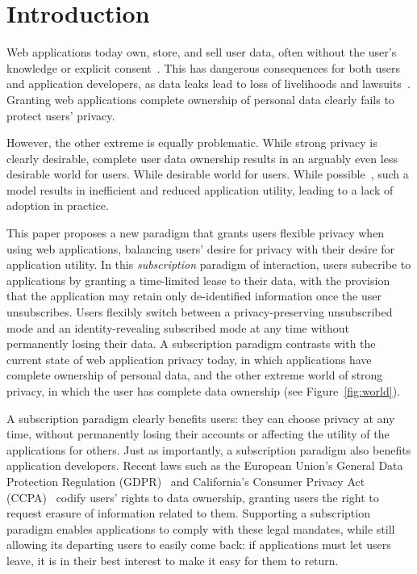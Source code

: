 \section{Introduction}

Web applications today own, store, and sell user data, often without the user's knowledge or
explicit consent~\cite{nytimes:fb, npr:data}. This has dangerous consequences for both users and
application developers, as data leaks lead to loss of livelihoods and
lawsuits~\cite{breach:amazon,breach:twitter, breach:fb, breach:marriott, breach:quora}. Granting web
applications complete ownership of personal data clearly fails to protect users' privacy. 

However, the other extreme is equally problematic.  While strong privacy is clearly desirable,
complete user data ownership results in an arguably even less desirable world for users. While
desirable world for users. While possible~\cite{amber, w5, blockstack, bstore}, such a model results
in inefficient and reduced application utility, leading to a lack of adoption in practice.  

This paper proposes a new paradigm that grants users flexible privacy when using web
applications, balancing users' desire for privacy with their desire for application utility. In this \emph{subscription} paradigm of interaction, users subscribe to applications by granting a time-limited lease to their data, with the provision that the application may retain only de-identified
information once the user unsubscribes. Users flexibly switch between a privacy-preserving
unsubscribed mode and an identity-revealing subscribed mode at any time without permanently losing
their data. 
A subscription paradigm contrasts with the current state of web application privacy today,
in which applications have complete ownership of personal data, and the other extreme world of
strong privacy, in which the user has complete data ownership (see Figure~\ref{fig:world}). 

A subscription paradigm clearly benefits users: they can choose privacy at any time, without permanently
losing their accounts or affecting the utility of the applications for others.
Just as importantly, a subscription paradigm  also benefits application developers. Recent laws
such as the European Union's General Data Protection Regulation (GDPR)~\cite{eu:gdpr} and
California's Consumer Privacy Act (CCPA)~\cite{ca:privacy-act} codify users' rights to data
ownership, granting users the right to request erasure of information related to them. Supporting
a subscription paradigm enables applications to comply with these legal mandates, while still allowing its departing users
to easily come back: if applications must let users leave, it is in their best interest to make it
easy for them to return.  

